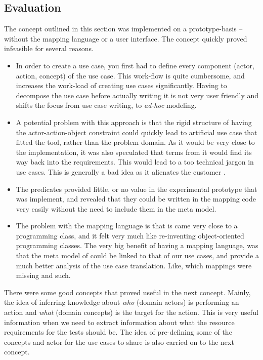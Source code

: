 \subsection{Evaluation}
The concept outlined in this section was implemented on a prototype-basis -- without the mapping language or a user interface. The concept quickly proved infeasible for several reasons.
\begin{itemize}
  \item In order to create a use case, you first had to define every component (actor, action, concept) of the use case. This work-flow is quite cumbersome, and increases the work-load of creating use cases significantly. Having to decompose the use case before actually writing it is not very user friendly and shifts the focus from use case writing, to \emph{ad-hoc} modeling.
  
  \item A potential problem with this approach is that the rigid structure of having the actor-action-object constraint could quickly lead to artificial use case that fitted the tool, rather than the problem domain. As it would be very close to the implementation, it was also speculated that terms from it would find its way back into the requirements. This would lead to a too technical jargon in use cases. This is generally a bad idea as it alienates the customer \cite{christel1992}.

  \item The predicates provided little, or no value in the experimental prototype that was implement, and revealed that they could be written in the mapping code very easily without the need to include them in the meta model.

  \item The problem with the mapping language is that is came very close to a programming class, and it felt very much like re-inventing object-oriented programming classes. The very big benefit of having a mapping language, was that the meta model of could be linked to that of our use cases, and provide a much better analysis of the use case translation. Like, which mappings were missing and such.

\end{itemize}
There were some good concepts that proved useful in the next concept. Mainly, the idea of inferring knowledge about \emph{who} (domain actors) is performing an action and \emph{what} (domain concepts) is the target for the action. This is very useful information when we need to extract information about what the resource requirements for the tests should be. The idea of pre-defining some of the concepts and actor for the use cases to share is also carried on to the next concept.

